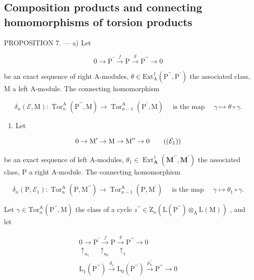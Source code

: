 \subsection{Composition products and connecting homomorphisms of torsion products}

PROPOSITION 7. --- a) Let

\[
0 \to \mathrm{P} ^ {\prime} \xrightarrow {f} \mathrm{P} \xrightarrow {g} \mathrm{P} ^ {\prime \prime} \to 0\tag{8}
\]

be an exact sequence of right A-modules, \(\theta\in\mathrm{Ext}_{\mathrm{A}}^{1}\left(\mathrm{P}^{\prime\prime},\mathrm{P}^{\prime}\right)\) the associated class, M a left A-module. The connecting homomorphism

\[
\delta_ {n} (\mathcal {E}, \mathrm{M}): \operatorname{Tor} _ {n} ^ {\mathrm{A}} \left(\mathrm{P} ^ {\prime \prime}, \mathrm{M}\right)\rightarrow \operatorname{Tor} _ {n - 1} ^ {\mathrm{A}} \left(\mathrm{P} ^ {\prime}, \mathrm{M}\right) \quad \text { is the map } \quad\gamma \mapsto \theta \circ \gamma .
\]

\begin{enumerate}
\def\labelenumi{\alph{enumi})}
\setcounter{enumi}{1}
\tightlist
\item
  Let
\end{enumerate}

\[
0 \rightarrow \mathrm{M} ^ {\prime} \rightarrow \mathrm{M} \rightarrow \mathrm{M} ^ {\prime \prime} \rightarrow 0\tag{$(\mathcal{E}_1)$}
\]

be an exact sequence of left A-modules, \(\theta_{1} \in \operatorname{Ext}_{\mathbf{A}}^{1}(\mathbf{M}^{\prime \prime}, \mathbf{M}^{\prime})\) the associated class, P a right A-module. The connecting homomorphism

\[
\delta_ {n} (\mathrm{P}, \mathcal {E} _ {1}): \operatorname{Tor} _ {n} ^ {\mathrm{A}} (\mathrm{P}, \mathrm{M} ^ {\prime \prime}) \rightarrow \operatorname{Tor} _ {n - 1} ^ {\mathrm{A}} (\mathrm{P}, \mathrm{M} ^ {\prime}) \quad \text { is the map } \quad\gamma \mapsto \theta_ {1} \circ \gamma .
\]

Let \(\gamma\in\mathrm{Tor}_{n}^{\mathrm{A}}(\mathrm{P}^{\prime\prime},\mathrm{M})\) the class of a cycle \(z^{\prime\prime}\in\dot{\mathrm{Z}}_{n}(\mathrm{L}(\mathrm{P}^{\prime\prime})\otimes_{\mathrm{A}}\mathrm{L}(\mathrm{M}))\) , and let

\[
\begin{array}{c} 0 \longrightarrow \mathrm{P} ^ {\prime} \xrightarrow {f} \mathrm{P} \xrightarrow {g} \mathrm{P} ^ {\prime \prime} \longrightarrow 0 \\ \uparrow_ {u _ {1}} \quad \uparrow_ {u _ {0}} \quad \uparrow_ {1} \\ \mathrm{L} _ {1} (\mathrm{P} ^ {\prime \prime}) \xrightarrow {d _ {1}} \mathrm{L} _ {0} (\mathrm{P} ^ {\prime \prime}) \xrightarrow {p _ {0} ^ {\prime \prime}} \mathrm{P} ^ {\prime \prime} \longrightarrow 0 \end{array}
\]

